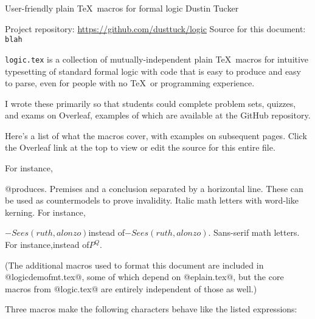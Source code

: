 



\heading
User-friendly plain \TeX\ macros for formal logic
Dustin Tucker
\strut
Project repository: \url{https://github.com/dusttuck/logic}
Source for this document: \tt blah
\endheading



{\tt logic.tex} is a collection of mutually-independent plain \TeX\ macros for intuitive typesetting of standard formal logic with code that is easy to produce and easy to parse, even for people with no \TeX\ or programming experience.

I wrote these primarily so that students could complete problem sets, quizzes, and exams on Overleaf, examples of which are available at the GitHub repository.

Here's a list of what the macros cover, with examples on subsequent pages. Click the Overleaf link at the top to view or edit the source for this entire file.

\unorderedlist
{} For instance,\logicstrut{0pt}{9.5pt}
\linebreak\strut\hfil@Ax[F(x) > -G(x,a)]@\qquad produces.
 Premises and a conclusion separated by a horizontal line.
 These can be used as countermodels to prove invalidity.
\li@{} Italic math letters with word-like kerning. For instance,\logicstrut{0pt}{9.5pt}
\linebreak\strut\hfil{\itmath$-Sees(ruth,alonzo)$}\qquad instead of\qquad$-Sees(ruth,alonzo)$.
\li@{} Sans-serif math letters. For instance,\qquad instead of\qquad$P^Q$.
\endunorderedlist

(The additional macros used to format this document are included in @logicdemofmt.tex@, some of which depend on @eplain.tex@, but the core macros from @logic.tex@ are entirely independent of those as well.)


\pagebreak
\itmath



Three macros make the following characters behave like the listed expressions:

\noindent\hfil\vbox\bgroup{}\egroup\hfil

